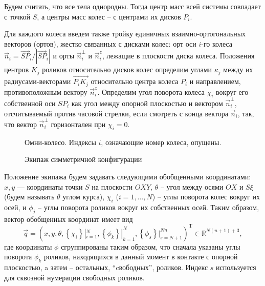 Будем считать, что все тела однородны. Тогда центр масс всей системы совпадает с точкой $S$, а центры масс колес -- с центрами их дисков $P_i$.

Для каждого колеса введем также тройку единичных взаимно-ортогональных векторов (ортов), жестко связанных с дисками колес: орт оси $i$-го колеса $\vec{n}_i = \vec{SP}_i/|\vec{SP}_i|$ и орты $\vec{n}_i^\perp$ и $\vec{n}_i^z$, лежащие в плоскости диска колеса. Положения центров $K_j$ роликов относительно дисков колес определим углами $\kappa_j$ между их радиусами-векторами $\overrightarrow{P_iK_j}$ относительно центра колеса $P_i$ и направлением, противоположным вектору $\vec{n}_i^z$. Определим угол поворота колеса $\chi_i$ вокруг его собственной оси $SP_i$ как угол между опорной плоскостью и вектором $\vec{n}_i^\perp$, отсчитываемый против часовой стрелки, если смотреть с конца вектора $\vec{n}_i$, так, что вектор $\vec{n}_i^\perp$ горизонтален при $\chi_i = 0$.

\begin{figure}[htb]
    \centering
        \centering
        \caption{Омни-колесо. Индексы $i$, означающие номер колеса, опущены.}
        \label{fig:wheel}
    \endminipage
    \quad
        \centering
        \caption{Экипаж симметричной конфигурации}
        \label{fig:vehicle}
    \endminipage
\end{figure}

Положение экипажа будем задавать следующими обобщенными координатами:
$x, y$ --- координаты точки $S$ на плоскости $OXY$, $\theta$ -- угол между осями $OX$ и $S\xi$ (будем называть $\theta$ углом курса),
$\chi_i$ ($i = 1,\dots,N$) -- углы поворота колес вокруг их осей, и $\phi_j$ -- углы поворота роликов вокруг их собственных осей.
Таким образом, вектор обобщенных координат имеет вид
\begin{equation}\label{eq:q}
    \vec{q} = (
        x, y, \theta,
        \left\{\chi_i\right\}|_{i=1}^N,
        \left\{\phi_k\right\}|_{k=1}^N,
        \left\{\phi_s\right\}|_{s=N + 1}^{Nn}
    )^{\mathop{T}}\in\mathbb{R}^{N(n+1) + 3},    
\end{equation}
 где координаты $\phi$ сгруппированы таким образом, что сначала указаны углы поворота $\phi_k$ роликов, находящихся в данный момент в контакте с опорной плоскостью, a затем -- остальных, ``cвободных'', роликов. Индекс $s$ используется для сквозной нумерации свободных роликов.

